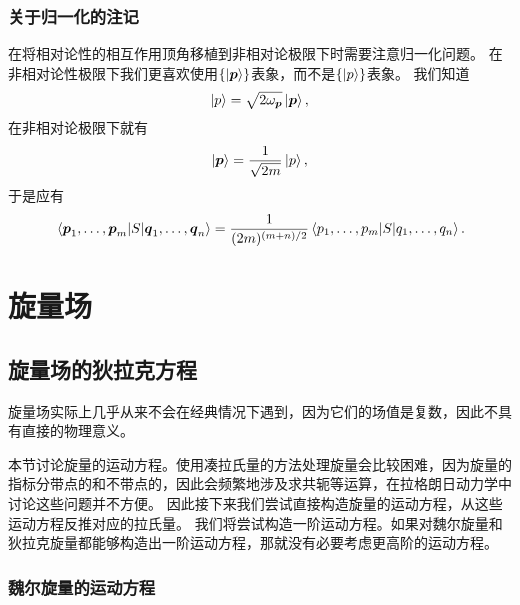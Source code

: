 \subsubsection{关于归一化的注记}

在将相对论性的相互作用顶角移植到非相对论极限下时需要注意归一化问题。
在非相对论性极限下我们更喜欢使用$\{\ket{\vb*{p}}\}$表象，而不是$\{\ket{p}\}$表象。
我们知道
\[
    \ket{p} = \sqrt{2 \omega_{\vb*{p}}} \ket{\vb*{p}},
\]
在非相对论极限下就有
\begin{equation}
    \ket{\vb*{p}} = \frac{1}{\sqrt{2m}} \ket{p},
\end{equation}
于是应有
\begin{equation}
    \mel*{\vb*{p}_1, \ldots, \vb*{p}_m}{S}{\vb*{q}_1, \ldots, \vb*{q}_n} = \frac{1}{(2m)^{(m+n)/2}} \mel*{p_1, \ldots, p_m}{S}{q_1, \ldots, q_n}.
\end{equation}

\section{旋量场}

\subsection{旋量场的狄拉克方程}

旋量场实际上几乎从来不会在经典情况下遇到，因为它们的场值是复数，因此不具有直接的物理意义。

本节讨论旋量的运动方程。使用凑拉氏量的方法处理旋量会比较困难，因为旋量的指标分带点的和不带点的，因此会频繁地涉及求共轭等运算，在拉格朗日动力学中讨论这些问题并不方便。
因此接下来我们尝试直接构造旋量的运动方程，从这些运动方程反推对应的拉氏量。
我们将尝试构造一阶运动方程。如果对魏尔旋量和狄拉克旋量都能够构造出一阶运动方程，那就没有必要考虑更高阶的运动方程。

\subsubsection{魏尔旋量的运动方程} 

